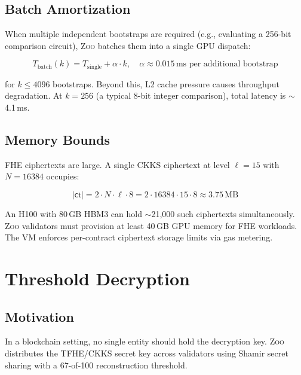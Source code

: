 \documentclass[11pt,letterpaper]{article}
\theoremstyle{definition}
\theoremstyle{remark}
\newcommand{\Zoo}{\textsc{Zoo}}
\newcommand{\TFHE}{\textsc{TFHE}}
\newcommand{\CKKS}{\textsc{CKKS}}
\begin{document}
\subsection{Batch Amortization}

When multiple independent bootstraps are required (e.g., evaluating a 256-bit comparison circuit), \Zoo{} batches them into a single GPU dispatch:

\begin{equation}
  T_{\mathrm{batch}}(k) = T_{\mathrm{single}} + \alpha \cdot k, \quad \alpha \approx 0.015\,\text{ms per additional bootstrap}
\end{equation}

\noindent for $k \leq 4096$ bootstraps. Beyond this, L2 cache pressure causes throughput degradation. At $k = 256$ (a typical 8-bit integer comparison), total latency is $\sim$4.1\,ms.

\subsection{Memory Bounds}

FHE ciphertexts are large. A single \CKKS{} ciphertext at level $\ell = 15$ with $N = 16384$ occupies:

\begin{equation}
  |\mathsf{ct}| = 2 \cdot N \cdot \ell \cdot 8 = 2 \cdot 16384 \cdot 15 \cdot 8 \approx 3.75\,\text{MB}
\end{equation}

An H100 with 80\,GB HBM3 can hold $\sim$21{,}000 such ciphertexts simultaneously. \Zoo{} validators must provision at least 40\,GB GPU memory for FHE workloads. The VM enforces per-contract ciphertext storage limits via gas metering.

\section{Threshold Decryption}
\label{sec:threshold}

\subsection{Motivation}

In a blockchain setting, no single entity should hold the decryption key. \Zoo{} distributes the \TFHE{}/\CKKS{} secret key across validators using Shamir secret sharing with a 67-of-100 reconstruction threshold.
\end{document}
